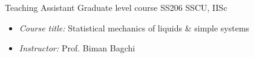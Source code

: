         {Teaching Assistant}
        {Graduate level course SS206}
        {SSCU, IISc}
        {}
        {\vspace{-1.0em}%
         \begin{itemize}%
         \setlength{\itemsep}{0.35em}
              \item {\itshape\color{color2} Course title:} %
                    Statistical mechanics of liquids \& simple systems
              \item {\itshape\color{color2} Instructor:} Prof. Biman Bagchi
         \end{itemize}
        }
